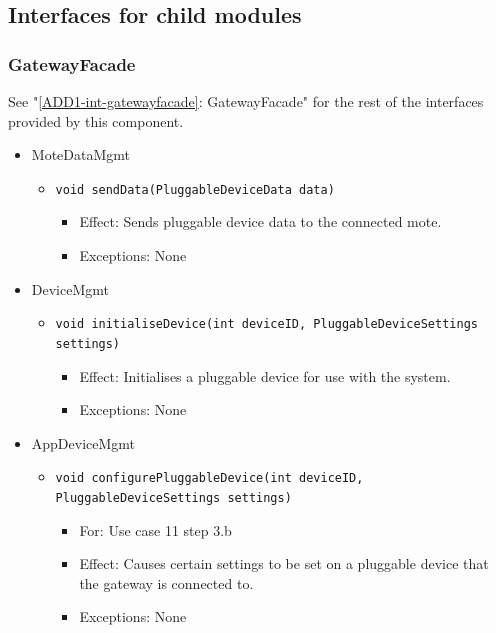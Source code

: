 \subsection{Interfaces for child modules}

    \subsubsection{GatewayFacade}
        See "\ref{ADD1-int-gatewayfacade}: GatewayFacade" for the rest of the interfaces provided by this component.
        \begin{itemize}
            \item MoteDataMgmt
            \begin{itemize}
                \item \texttt{void sendData(PluggableDeviceData data)}
                \begin{itemize}
                    \item Effect: Sends pluggable device data to the connected mote.
                    \item Exceptions: None
                \end{itemize}
            \end{itemize}

            \item DeviceMgmt
            \begin{itemize}
                \item \texttt{void initialiseDevice(int deviceID, PluggableDeviceSettings settings)}
                \begin{itemize}
                    \item Effect: Initialises a pluggable device for use with the system.
                    \item Exceptions: None
                \end{itemize}
            \end{itemize}

            \item AppDeviceMgmt
            \begin{itemize}
                \item \texttt{void configurePluggableDevice(int deviceID, PluggableDeviceSettings settings)}
                \begin{itemize}
                    \item For: Use case 11 step 3.b
                    \item Effect: Causes certain settings to be set on a pluggable
                          device that the gateway is connected to.
                    \item Exceptions: None
                \end{itemize}
            \end{itemize}
        \end{itemize}

